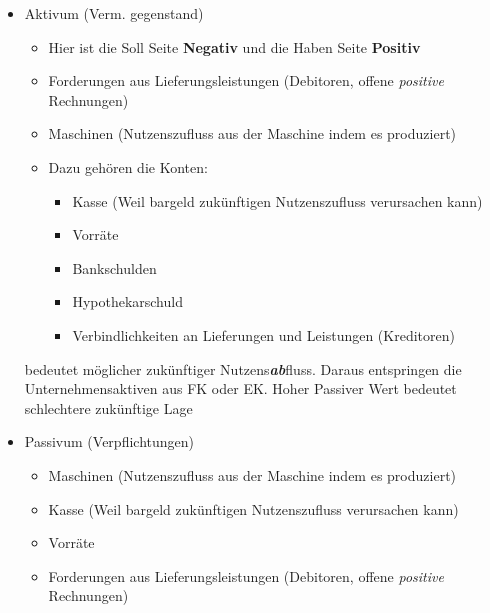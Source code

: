 \begin{itemize}
    \item Aktivum (Verm. gegenstand)
    \begin{itemize}

        \item Hier ist die Soll Seite \textbf{Negativ} und die Haben Seite \textbf{Positiv} 
        \item Forderungen aus Lieferungsleistungen (Debitoren, offene \textit{positive} Rechnungen)
        \item Maschinen (Nutzenszufluss aus der Maschine indem es produziert)
        \item Dazu gehören die Konten:
        
        \begin{itemize}
            \item Kasse (Weil bargeld zukünftigen Nutzenszufluss verursachen kann)
            \item Vorräte    
            
            \item Bankschulden 
            
            \item Hypothekarschuld
            
            \item Verbindlichkeiten an Lieferungen und Leistungen (Kreditoren)
        \end{itemize}

    \end{itemize}
    \pagebreak
\begin{definition}
     bedeutet möglicher zukünftiger Nutzens\textbf{\textit{ab}}fluss. Daraus entspringen die Unternehmensaktiven aus FK oder EK. Hoher Passiver Wert bedeutet schlechtere zukünftige Lage
\end{definition}
    \item Passivum (Verpflichtungen)
    \begin{itemize}
                \item Maschinen (Nutzenszufluss aus der Maschine indem es produziert)

        \item Kasse (Weil bargeld zukünftigen Nutzenszufluss verursachen kann)

        \item Vorräte    

        \item Forderungen aus Lieferungsleistungen (Debitoren, offene \textit{positive} Rechnungen)


\end{itemize}
\end{itemize}
